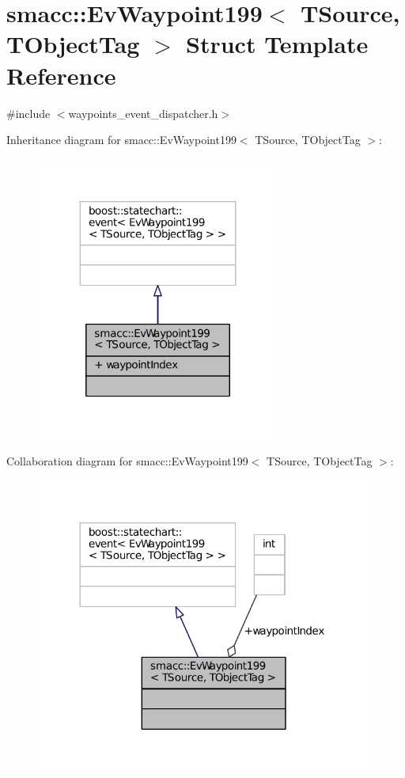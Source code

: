 \hypertarget{structsmacc_1_1EvWaypoint199}{}\section{smacc\+:\+:Ev\+Waypoint199$<$ T\+Source, T\+Object\+Tag $>$ Struct Template Reference}
\label{structsmacc_1_1EvWaypoint199}


{\ttfamily \#include $<$waypoints\+\_\+event\+\_\+dispatcher.\+h$>$}



Inheritance diagram for smacc\+:\+:Ev\+Waypoint199$<$ T\+Source, T\+Object\+Tag $>$\+:
\nopagebreak
\begin{figure}[H]
\begin{center}
\leavevmode
\includegraphics[width=227pt]{structsmacc_1_1EvWaypoint199__inherit__graph}
\end{center}
\end{figure}


Collaboration diagram for smacc\+:\+:Ev\+Waypoint199$<$ T\+Source, T\+Object\+Tag $>$\+:
\nopagebreak
\begin{figure}[H]
\begin{center}
\leavevmode
\includegraphics[width=312pt]{structsmacc_1_1EvWaypoint199__coll__graph}
\end{center}
\end{figure}
